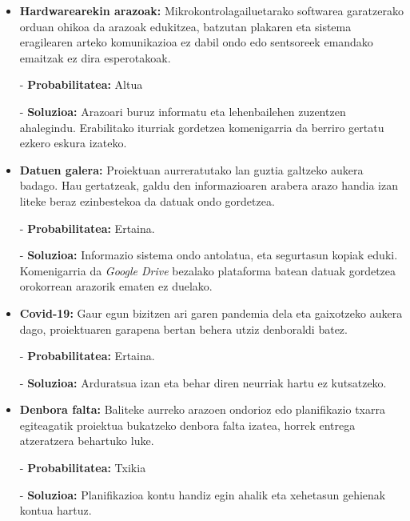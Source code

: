 \begin{itemize}
    \item \textbf{Hardwarearekin arazoak:} Mikrokontrolagailuetarako softwarea garatzerako orduan ohikoa da arazoak edukitzea, batzutan plakaren eta sistema eragilearen arteko komunikazioa ez dabil ondo edo sentsoreek emandako emaitzak ez dira esperotakoak. 
        
        - \textbf{Probabilitatea:} Altua
        
        - \textbf{Soluzioa:} Arazoari buruz informatu eta lehenbailehen zuzentzen ahalegindu. Erabilitako iturriak gordetzea komenigarria da berriro gertatu ezkero eskura izateko.
        
        
    \item \textbf{Datuen galera:} Proiektuan aurreratutako lan guztia galtzeko aukera badago. Hau gertatzeak, galdu den informazioaren arabera arazo handia izan liteke beraz ezinbestekoa da datuak ondo gordetzea. 
        
        - \textbf{Probabilitatea:} Ertaina.
        
        - \textbf{Soluzioa:} Informazio sistema ondo antolatua, eta segurtasun kopiak eduki. Komenigarria da \textit{Google Drive} bezalako plataforma batean datuak gordetzea orokorrean arazorik ematen ez duelako.
        
    \item \textbf{Covid-19:} Gaur egun bizitzen ari garen pandemia dela eta gaixotzeko aukera dago, proiektuaren garapena bertan behera utziz denboraldi batez.
        
        - \textbf{Probabilitatea:} Ertaina.
        
        - \textbf{Soluzioa:} Arduratsua izan eta behar diren neurriak hartu ez kutsatzeko.
        
    \item \textbf{Denbora falta:} Baliteke aurreko arazoen ondorioz edo planifikazio txarra egiteagatik proiektua bukatzeko denbora falta izatea, horrek entrega atzeratzera behartuko luke.
        
        - \textbf{Probabilitatea:} Txikia
        
        - \textbf{Soluzioa:} Planifikazioa kontu handiz egin ahalik eta xehetasun gehienak kontua hartuz.
    
\end{itemize}